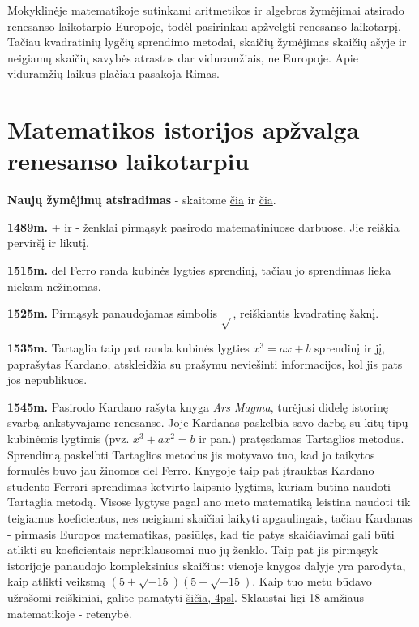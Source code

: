 \documentclass{article}
\begin{document}
Mokyklinėje matematikoje sutinkami aritmetikos ir algebros žymėjimai atsirado renesanso laikotarpio Europoje, todėl pasirinkau apžvelgti renesanso laikotarpį. Tačiau kvadratinių lygčių sprendimo metodai, skaičių žymėjimas skaičių ašyje ir neigiamų skaičių savybės atrastos dar viduramžiais, ne Europoje. Apie viduramžių laikus plačiau \href{http://norvaisa.lt/matematika/mokykline-matematika/kodel-neigiamuju-skaiciu-sandauga-yra-teigiamas-skaicius/}{pasakoja Rimas}.

\section*{Matematikos istorijos apžvalga renesanso laikotarpiu}
\textbf{Naujų žymėjimų atsiradimas} - skaitome \href{http://jeff560.tripod.com/operation.html}{čia} ir \href{https://www.math.ucdavis.edu/~anne/WQ2007/mat67-Common_Math_Symbols.pdf}{čia}.

\textbf{1489m.} + ir - ženklai pirmąsyk pasirodo matematiniuose darbuose. Jie reiškia perviršį ir likutį.

\textbf{1515m.} del Ferro randa kubinės lygties sprendinį, tačiau jo sprendimas lieka niekam nežinomas.

\textbf{1525m.} Pirmąsyk panaudojamas simbolis $\sqrt{}$, reiškiantis kvadratinę šaknį.

\textbf{1535m.} Tartaglia taip pat randa kubinės lygties $x^3=ax+b$ sprendinį ir jį, paprašytas Kardano, atskleidžia su prašymu neviešinti informacijos, kol jis pats jos nepublikuos.

\textbf{1545m.} Pasirodo Kardano rašyta knyga \textit{Ars Magma}, turėjusi didelę istorinę svarbą ankstyvajame renesanse. Joje Kardanas paskelbia savo darbą su kitų tipų kubinėmis lygtimis (pvz. $x^3+ax^2=b$ ir pan.) pratęsdamas Tartaglios metodus. Sprendimą paskelbti Tartaglios metodus jis motyvavo tuo, kad jo taikytos formulės buvo jau žinomos del Ferro. Knygoje taip pat įtrauktas Kardano studento Ferrari sprendimas ketvirto laipsnio lygtims, kuriam būtina naudoti Tartaglia metodą. Visose lygtyse pagal ano meto matematiką leistina naudoti tik teigiamus koeficientus, nes neigiami skaičiai laikyti apgaulingais, tačiau Kardanas - pirmasis Europos matematikas, pasiūlęs, kad tie patys skaičiavimai gali būti atlikti su koeficientais nepriklausomai nuo jų ženklo. Taip pat jis pirmąsyk istorijoje panaudojo kompleksinius skaičius: vienoje knygos dalyje yra parodyta, kaip atlikti veiksmą $(5+\sqrt{-15})(5-\sqrt{-15})$. Kaip tuo metu būdavo užrašomi reiškiniai, galite pamatyti \href{http://www.ms.uky.edu/~sohum/ma330/files/eqns_2.pdf}{šičia, 4psl}. Sklaustai ligi 18 amžiaus matematikoje - retenybė.
\end{document}
